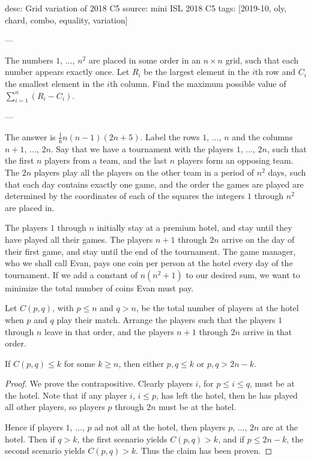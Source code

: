 desc: Grid variation of 2018 C5
source: mini ISL 2018 C5
tags: [2019-10, oly, chard, combo, equality, variation]

---

The numbers $1$, $\ldots$, $n^2$ are placed in some order in an $n\times n$ grid, such that each number appears exactly once. Let $R_i$ be the largest element in the $i$th row and $C_i$ the smallest element in the $i$th column. Find the maximum possible value of $\sum_{i=1}^n(R_i-C_i)$.

---

The answer is $\frac16n(n-1)(2n+5)$. Label the rows $1$, $\ldots$, $n$ and the columns $n+1$, $\ldots$, $2n$. Say that we have a tournament with the players $1$, $\ldots$, $2n$, such that the first $n$ players from a team, and the last $n$ players form an opposing team. The $2n$ players play all the players on the other team in a period of $n^2$ days, such that each day contains exactly one game, and the order the games are played are determined by the coordinates of each of the squares the integers $1$ through $n^2$ are placed in.

The players $1$ through $n$ initially stay at a premium hotel, and stay until they have played all their games. The players $n+1$ through $2n$ arrive on the day of their first game, and stay until the end of the tournament. The game manager, who we shall call Evan, pays one coin per person at the hotel every day of the tournament. If we add a constant of $n(n^2+1)$ to our desired sum, we want to minimize the total number of coins Evan must pay.

Let $C(p,q)$, with $p\le n$ and $q>n$, be the total number of players at the hotel when $p$ and $q$ play their match. Arrange the players such that the players $1$ through $n$ leave in that order, and the players $n+1$ through $2n$ arrive in that order.
\begin{claim*}
    If $C(p,q)\le k$ for some $k\ge n$, then either $p,q\le k$ or $p,q>2n-k$.
\end{claim*}
\begin{proof}
    We prove the contrapositive. Clearly players $i$, for $p\le i\le q$, must be at the hotel. Note that if any player $i$, $i\le p$, has left the hotel, then he has played all other players, so players $p$ through $2n$ must be at the hotel.

    Hence if players $1$, $\ldots$, $p$ ad not all at the hotel, then players $p$, $\ldots$, $2n$ are at the hotel. Then if $q>k$, the first scenario yields $C(p,q)>k$, and if $p\le 2n-k$, the second scenario yields $C(p,q)>k$. Thus the claim has been proven.
\end{proof}

